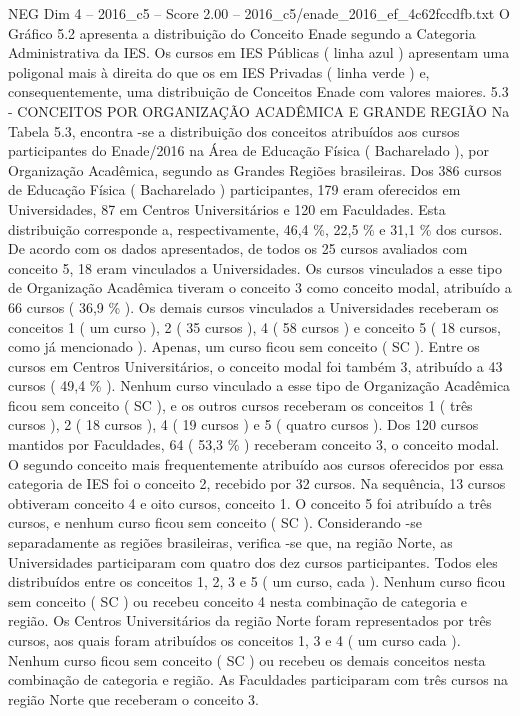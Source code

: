 \begin{textsample}{NEG Dim 4 – 2016\_c5 – Score 2.00 – 2016\_c5/enade\_2016\_ef\_4c62fccdfb.txt}
O Gráfico 5.2 apresenta a distribuição do Conceito Enade segundo a Categoria Administrativa da IES.
Os cursos em IES Públicas ( linha azul ) apresentam uma poligonal mais à direita do que os em IES Privadas ( linha verde ) e, consequentemente, uma distribuição de Conceitos Enade com valores maiores. 5.3 - CONCEITOS POR ORGANIZAÇÃO ACADÊMICA E GRANDE REGIÃO Na Tabela 5.3, encontra -se a distribuição dos conceitos atribuídos aos cursos participantes do Enade/2016 na Área de Educação Física ( Bacharelado ), por Organização Acadêmica, segundo as Grandes Regiões brasileiras.
Dos 386 cursos de Educação Física ( Bacharelado ) participantes, 179 eram oferecidos em Universidades, 87 em Centros Universitários e 120 em Faculdades.
Esta distribuição corresponde a, respectivamente, 46,4 \%, 22,5 \% e 31,1 \% dos cursos.
De acordo com os dados apresentados, de todos os 25 cursos avaliados com conceito 5, 18 eram vinculados a Universidades.
Os cursos vinculados a esse tipo de Organização Acadêmica tiveram o conceito 3 como conceito modal, atribuído a 66 cursos ( 36,9 \% ).
Os demais cursos vinculados a Universidades receberam os conceitos 1 ( um curso ), 2 ( 35 cursos ), 4 ( 58 cursos ) e conceito 5 ( 18 cursos, como já mencionado ).
Apenas, um curso ficou sem conceito ( SC ).
Entre os cursos em Centros Universitários, o conceito modal foi também 3, atribuído a 43 cursos ( 49,4 \% ).
Nenhum curso vinculado a esse tipo de Organização Acadêmica ficou sem conceito ( SC ), e os outros cursos receberam os conceitos 1 ( três cursos ), 2 ( 18 cursos ), 4 ( 19 cursos ) e 5 ( quatro cursos ).
Dos 120 cursos mantidos por Faculdades, 64 ( 53,3 \% ) receberam conceito 3, o conceito modal.
O segundo conceito mais frequentemente atribuído aos cursos oferecidos por essa categoria de IES foi o conceito 2, recebido por 32 cursos.
Na sequência, 13 cursos obtiveram conceito 4 e oito cursos, conceito 1.
O conceito 5 foi atribuído a três cursos, e nenhum curso ficou sem conceito ( SC ).
Considerando -se separadamente as regiões brasileiras, verifica -se que, na região Norte, as Universidades participaram com quatro dos dez cursos participantes.
Todos eles distribuídos entre os conceitos 1, 2, 3 e 5 ( um curso, cada ).
Nenhum curso ficou sem conceito ( SC ) ou recebeu conceito 4 nesta combinação de categoria e região.
Os Centros Universitários da região Norte foram representados por três cursos, aos quais foram atribuídos os conceitos 1, 3 e 4 ( um curso cada ).
Nenhum curso ficou sem conceito ( SC ) ou recebeu os demais conceitos nesta combinação de categoria e região.
As Faculdades participaram com três cursos na região Norte que receberam o conceito 3.

\end{textsample}
